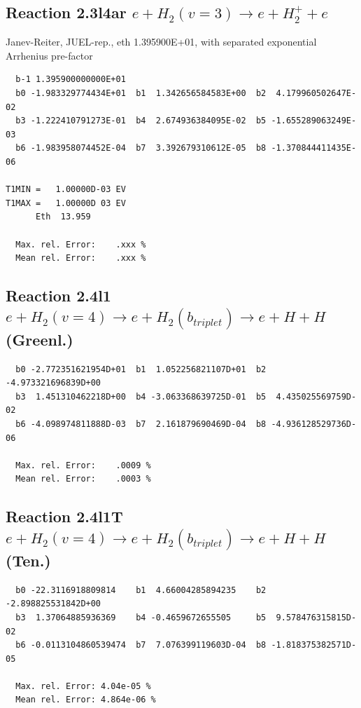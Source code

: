 \documentclass[12pt,dvipdfmx]{article}
\begin{document}
\subsection{
Reaction 2.3l4ar
 $ e + H_2(v=3) \rightarrow e + H_2^+  + e $
}
Janev-Reiter, JUEL-rep., eth 1.395900E+01,
with separated exponential Arrhenius pre-factor

\begin{small}\begin{verbatim}
  b-1 1.395900000000E+01
  b0 -1.983329774434E+01  b1  1.342656584583E+00  b2  4.179960502647E-02
  b3 -1.222410791273E-01  b4  2.674936384095E-02  b5 -1.655289063249E-03
  b6 -1.983958074452E-04  b7  3.392679310612E-05  b8 -1.370844411435E-06

T1MIN =   1.00000D-03 EV
T1MAX =   1.00000D 03 EV
      Eth  13.959

  Max. rel. Error:    .xxx %
  Mean rel. Error:    .xxx %
\end{verbatim}\end{small}
\newpage

\subsection{
Reaction 2.4l1
$ e + H_2(v=4) \rightarrow e + H_2(b_{triplet})\rightarrow e + H + H $ (Greenl.)
}


\begin{small}\begin{verbatim}
  b0 -2.772351621954D+01  b1  1.052256821107D+01  b2 -4.973321696839D+00
  b3  1.451310462218D+00  b4 -3.063368639725D-01  b5  4.435025569759D-02
  b6 -4.098974811888D-03  b7  2.161879690469D-04  b8 -4.936128529736D-06

  Max. rel. Error:    .0009 %
  Mean rel. Error:    .0003 %

\end{verbatim}\end{small}



\subsection{
Reaction 2.4l1T
$  e + H_2(v=4) \rightarrow e + H_2(b_{triplet})\rightarrow e + H + H $ (Ten.)
}


\begin{small}\begin{verbatim}
  b0 -22.3116918809814    b1  4.66004285894235    b2 -2.898825531842D+00
  b3  1.37064885936369    b4 -0.4659672655505     b5  9.578476315815D-02
  b6 -0.0113104860539474  b7  7.076399119603D-04  b8 -1.818375382571D-05

  Max. rel. Error: 4.04e-05 %
  Mean rel. Error: 4.864e-06 %
\end{verbatim}\end{small}
\end{document}
